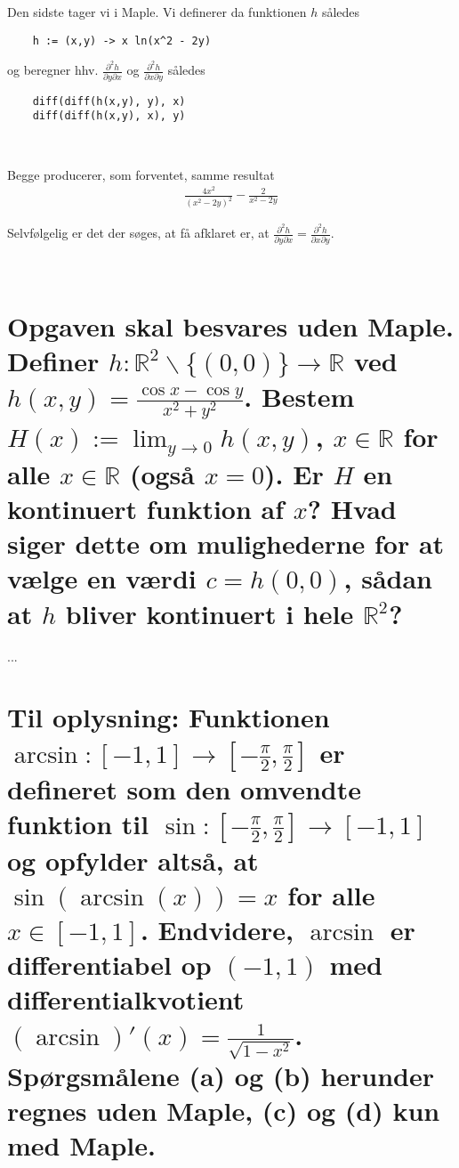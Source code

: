 \documentclass[11pt,a4paper]{article}
\newcommand{\limit}[2]{\lim_{#1 \rightarrow #2}}
\begin{document}
\begin{multicols}{2}

    Den sidste tager vi i Maple. Vi definerer da funktionen $h$ således
    \begin{lstlisting}
    h := (x,y) -> x ln(x^2 - 2y)
    \end{lstlisting}
    og beregner hhv. $\frac{\partial^2 h}{\partial y \partial x}$ og
    $\frac{\partial^2 h}{\partial x \partial y}$ således
    \begin{lstlisting}
    diff(diff(h(x,y), y), x)
    diff(diff(h(x,y), x), y)
    \end{lstlisting}
    
    \vfill{\ }\columnbreak

    Begge producerer, som forventet, samme resultat
    \begin{align}
        \frac{4x^2}{(x^2 - 2y)^2} - \frac{2}{x^2 - 2y} 
    \end{align}

    Selvfølgelig er det der søges, at få afklaret er, at
    $\frac{\partial^2 h}{\partial y \partial x} =
    \frac{\partial^2 h}{\partial x \partial y}$.

    \vfill{\ }
\end{multicols}

\section
{
    \mdseries
    Opgaven skal besvares uden Maple. Definer $h : \mathbb{R}^2 \backslash
    \{(0,0)\} \rightarrow \mathbb{R}$ ved $h(x,y) = \frac{\cos x - \cos y}
    {x^2 + y^2}$. Bestem $H(x) := \limit{y}{0} h(x,y)$, $x \in \mathbb{R}$ for
    alle $x \in \mathbb{R}$ (også $x = 0$). Er $H$ en kontinuert funktion af
    $x$? Hvad siger dette om mulighederne for at vælge en værdi $c = h(0,0)$,
    sådan at $h$ bliver kontinuert i hele $\mathbb{R}^2$?
}
...

\section
{
    \mdseries
    Til oplysning: Funktionen $\arcsin : [-1,1] \rightarrow [-\frac{\pi}{2},
    \frac{\pi}{2}]$ er defineret som den omvendte funktion til $\sin :
    [-\frac{\pi}{2}, \frac{\pi}{2}] \rightarrow [-1,1]$ og opfylder altså, at
    $\sin(\arcsin(x)) = x$ for alle $x \in [-1,1]$. Endvidere, $\arcsin$ er
    differentiabel op $(-1,1)$ med differentialkvotient $(\arcsin)'(x) =
    \frac{1}{\sqrt{1 - x^2}}$. Spørgsmålene (a) og (b) herunder regnes uden
    Maple, (c) og (d) kun med Maple.
}
\end{document}
